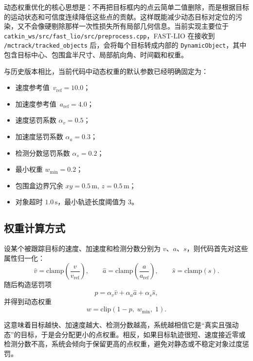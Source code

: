 \documentclass[UTF8,a4paper,12pt]{ctexart}
\begin{document}
动态权重优化的核心思想是：不再把目标框内的点云简单二值删除，而是根据目标的运动状态和可信度连续降低这些点的贡献。这样既能减少动态目标对定位的污染，又不会像硬剔除那样一次性损失所有局部几何信息。当前实现主要位于 \texttt{catkin\_ws/src/fast\_lio/src/preprocess.cpp}，FAST-LIO 在接收到 \texttt{/mctrack/tracked\_objects} 后，会将每个目标转成内部的 \texttt{DynamicObject}，其中包含目标中心、包围盒半尺寸、局部航向角、时间戳和权重。

与历史版本相比，当前代码中动态权重的默认参数已经明确固定为：
\begin{itemize}[leftmargin=2em]
    \item 速度参考值 \(\,v_{\mathrm{ref}}=10.0\)；
    \item 加速度参考值 \(\,a_{\mathrm{ref}}=4.0\)；
    \item 速度惩罚系数 \(\alpha_v=0.5\)；
    \item 加速度惩罚系数 \(\alpha_a=0.3\)；
    \item 检测分数惩罚系数 \(\alpha_s=0.2\)；
    \item 最小权重 \(w_{\min}=0.2\)；
    \item 包围盒边界冗余 \(xy=0.5\,\mathrm{m},\,z=0.5\,\mathrm{m}\)；
    \item 对象超时 \(1.0\,\mathrm{s}\)，最小轨迹长度阈值为 3。
\end{itemize}

\subsection{权重计算方式}
设某个被跟踪目标的速度、加速度和检测分数分别为 \(v\)、\(a\)、\(s\)，则代码首先对这些属性归一化：
\begin{equation}
\hat{v}=\mathrm{clamp}\!\left(\frac{v}{v_{\mathrm{ref}}}\right), \qquad
\hat{a}=\mathrm{clamp}\!\left(\frac{a}{a_{\mathrm{ref}}}\right), \qquad
\hat{s}=\mathrm{clamp}(s).
\end{equation}
随后构造惩罚项
\begin{equation}
p = \alpha_v \hat{v} + \alpha_a \hat{a} + \alpha_s \hat{s},
\end{equation}
并得到动态权重
\begin{equation}
w = \mathrm{clip}(1-p,\; w_{\min},\; 1).
\end{equation}

这意味着目标越快、加速度越大、检测分数越高，系统越相信它是“真实且强动态”的目标，于是会分配更小的点权重。相反，如果目标轨迹很短、速度接近零或检测分数不高，系统会倾向于保留更高的点权重，避免对静态或不稳定对象过度惩罚。
\end{document}
